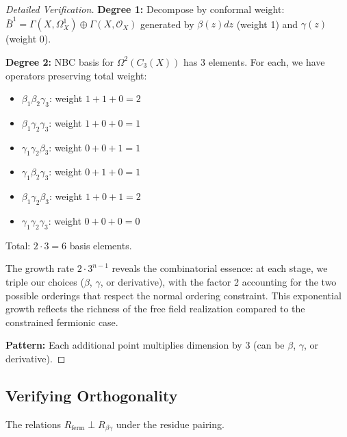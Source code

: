 \begin{proof}[Detailed Verification]
\textbf{Degree 1:} Decompose by conformal weight:
$\bar{B}^1 = \Gamma(X, \Omega^1_X) \oplus \Gamma(X, \mathcal{O}_X)$
generated by $\beta(z)dz$ (weight 1) and $\gamma(z)$ (weight 0).

\textbf{Degree 2:} NBC basis for $\Omega^2(C_3(X))$ has 3 elements.
For each, we have operators preserving total weight:
\begin{itemize}
\item $\beta_1 \beta_2 \gamma_3$: weight $1+1+0=2$
\item $\beta_1 \gamma_2 \gamma_3$: weight $1+0+0=1$  
\item $\gamma_1 \gamma_2 \beta_3$: weight $0+0+1=1$
\item $\gamma_1 \beta_2 \gamma_3$: weight $0+1+0=1$
\item $\beta_1 \gamma_2 \beta_3$: weight $1+0+1=2$
\item $\gamma_1 \gamma_2 \gamma_3$: weight $0+0+0=0$
\end{itemize}
Total: $2 \cdot 3 = 6$ basis elements.

\begin{remark}
The growth rate $2 \cdot 3^{n-1}$ reveals the combinatorial essence: at each stage, we triple our choices ($\beta$, $\gamma$, or derivative), with the factor 2 accounting for the two possible orderings that respect the normal ordering constraint. This exponential growth reflects the richness of the free field realization compared to the constrained fermionic case.
\end{remark}

\textbf{Pattern:} Each additional point multiplies dimension by 3 (can be $\beta$, $\gamma$, or derivative).
\end{proof}
 
\subsection{Verifying Orthogonality}
 
\begin{proposition}
The relations $R_{\text{ferm}} \perp R_{\beta\gamma}$ under the residue pairing.
\end{proposition}
 
